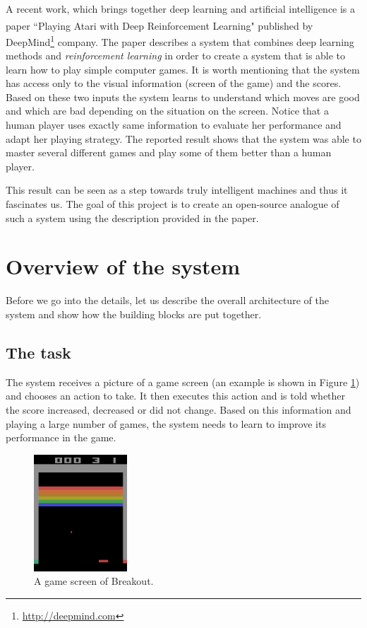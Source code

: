 \documentclass[a4paper,12pt]{article}
\begin{document}
A recent work, which brings together deep learning and artificial intelligence is a paper ``Playing Atari with Deep Reinforcement Learning"\textsuperscript{\cite{mnih2013playing}} published by DeepMind\footnote{\url{http://deepmind.com}} company. The paper describes a system that combines deep learning methods and \emph{reinforcement learning} in order to create a system that is able to learn how to play simple computer games. It is worth mentioning that the system has access only to the visual information (screen of the game) and the scores. Based on these two inputs the system learns to understand which moves are good and which are bad depending on the situation on the screen. Notice that a human player uses exactly same information to evaluate her performance and adapt her playing strategy. The reported result shows that the system was able to master several different games and play some of them better than a human player.

This result can be seen as a step towards truly intelligent machines and thus it fascinates us. The goal of this project is to create an open-source analogue of such a system using the description provided in the paper.



%
%
\pagebreak
\section{Overview of the system}
Before we go into the details, let us describe the overall architecture of the system and show how the building blocks are put together. 

\subsection{The task}

The system receives a picture of a game screen (an example is shown in Figure \ref{fig:breakoutscreen}) and chooses an action to take. It then executes this action and is told whether the score increased, decreased or did not change. Based on this information and playing a large number of games, the system needs to learn to improve its performance in the game.

\begin{figure}[h]
\centering
\includegraphics[width=3.5cm]{images/fig_gamescreen.png}
\caption{A game screen of Breakout.}
\label{fig:breakoutscreen}
\end{figure}
\end{document}
